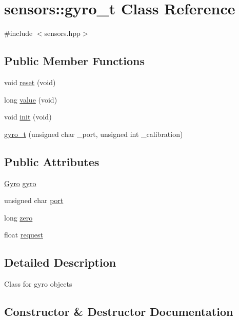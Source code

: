 \hypertarget{classsensors_1_1gyro__t}{}\section{sensors\+:\+:gyro\+\_\+t Class Reference}
\label{classsensors_1_1gyro__t}


{\ttfamily \#include $<$sensors.\+hpp$>$}

\subsection*{Public Member Functions}
\begin{DoxyCompactItemize}
\item 
void \hyperlink{classsensors_1_1gyro__t_a5616b7066c0eb535866f51fa55a7e22b}{reset} (void)
\item 
long \hyperlink{classsensors_1_1gyro__t_acfab48fd9d83607a599e73f054f04c0e}{value} (void)
\item 
void \hyperlink{classsensors_1_1gyro__t_a01d25ac8eb835e284da8ae7842262619}{init} (void)
\item 
\hyperlink{classsensors_1_1gyro__t_a081de8249e08672f5e289f88d1017c49}{gyro\+\_\+t} (unsigned char \+\_\+port, unsigned int \+\_\+calibration)
\end{DoxyCompactItemize}
\subsection*{Public Attributes}
\begin{DoxyCompactItemize}
\item 
\hyperlink{API_8h_a04e06985633aa933343fcfa3d7fb268d}{Gyro} \hyperlink{classsensors_1_1gyro__t_a6174c882a5151d0b1461408d40403c5e}{gyro}
\item 
unsigned char \hyperlink{classsensors_1_1gyro__t_aed9a64ee6944cef330bc769c606cb7e9}{port}
\item 
long \hyperlink{classsensors_1_1gyro__t_ac66c52c31ee9cff57a88b514a9f99051}{zero}
\item 
float \hyperlink{classsensors_1_1gyro__t_a9367db771651c0dbdf14fac3946e8582}{request}
\end{DoxyCompactItemize}


\subsection{Detailed Description}
Class for gyro objects 

\subsection{Constructor \& Destructor Documentation}
\mbox{\label{classsensors_1_1gyro__t_a081de8249e08672f5e289f88d1017c49}} 
